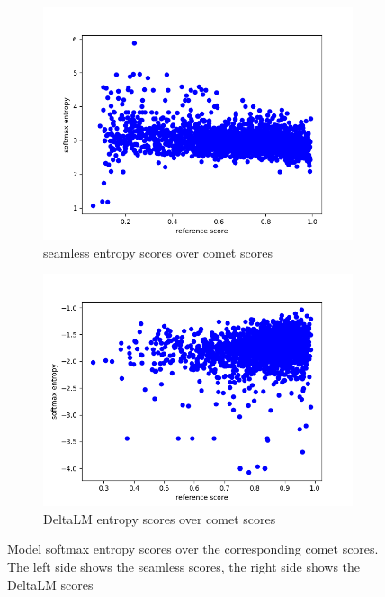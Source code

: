 \begin{figure}[ht]
        \centering%
    \begin{subfigure}{0.4\linewidth}
        \includegraphics[width=\textwidth]{Latex/sections/images/seamlessentropy.png}
        \caption{seamless entropy scores over comet scores}
    \end{subfigure}
    \begin{subfigure}{0.4\linewidth}
        \includegraphics[width=\textwidth]{Latex/sections/images/dlmentropy.png}
        \caption{DeltaLM entropy scores over comet scores}
    \end{subfigure}
    \caption{Model softmax entropy scores over the corresponding comet scores. The left side shows the seamless scores, the right side shows the DeltaLM scores}
    \label{fig:translationeval scatter plot entropy}
\end{figure}

